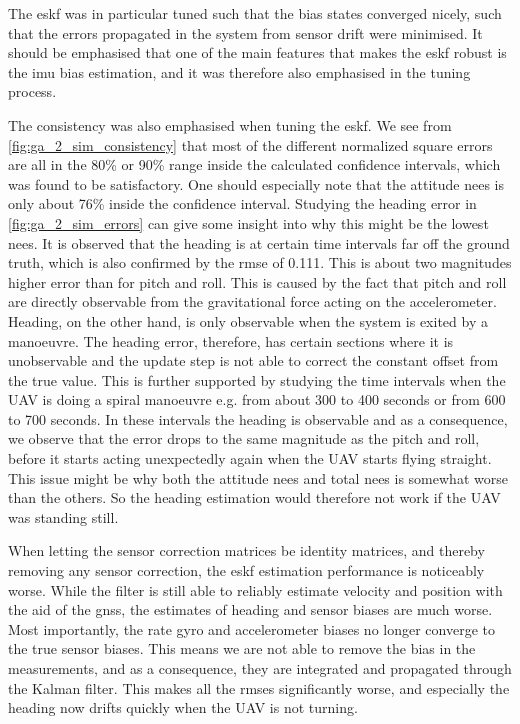 The \acrshort{eskf} was in particular tuned such that the bias states converged nicely, such that the errors propagated in the system from sensor drift were minimised. It should be emphasised that one of the main features that makes the \acrshort{eskf} robust is the \acrshort{imu} bias estimation, and it was therefore also emphasised in the tuning process.

The consistency was also emphasised when tuning the \acrshort{eskf}. We see from \cref{fig:ga_2_sim_consistency} that most of the different normalized square errors are all in the 80\% or 90\% range inside the calculated confidence intervals, which was found to be satisfactory. One should especially note that the attitude \acrshort{nees} is only about 76\% inside the confidence interval. Studying the heading error in \cref{fig:ga_2_sim_errors} can give some insight into why this might be the lowest \acrshort{nees}. It is observed that the heading is at certain time intervals far off the ground truth, which is also confirmed by the \acrshort{rmse} of 0.111. This is about two magnitudes higher error than for pitch and roll. This is caused by the fact that pitch and roll are directly observable from the gravitational force acting on the accelerometer. Heading, on the other hand, is only observable when the system is exited by a manoeuvre. The heading error, therefore, has certain sections where it is unobservable and the update step is not able to correct the constant offset from the true value. This is further supported by studying the time intervals when the UAV is doing a spiral manoeuvre e.g. from about 300 to 400 seconds or from 600 to 700 seconds. In these intervals the heading is observable and as a consequence, we observe that the error drops to the same magnitude as the pitch and roll, before it starts acting unexpectedly again when the UAV starts flying straight. This issue might be why both the attitude \acrshort{nees} and total \acrshort{nees} is somewhat worse than the others. So the heading estimation would therefore not work if the UAV was standing still. 

When letting the sensor correction matrices be identity matrices, and thereby removing any sensor correction, the \acrshort{eskf} estimation performance is noticeably worse. While the filter is still able to reliably estimate velocity and position with the aid of the \acrshort{gnss}, the estimates of heading and sensor biases are much worse. Most importantly, the rate gyro and accelerometer biases no longer converge to the true sensor biases. This means we are not able to remove the bias in the measurements, and as a consequence, they are integrated and propagated through the Kalman filter. This makes all the \acrshort{rmse}s significantly worse, and especially the heading now drifts quickly when the UAV is not turning.

